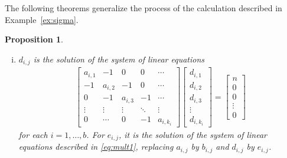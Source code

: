 \documentclass[10pt,a4paper,reqno]{amsart}
\newtheorem{prop}[thm]{Proposition}
\theoremstyle{definition}
\numberwithin{equation}{section}
\numberwithin{figure}{section}
\begin{document}
The following theorems generalize the process of the calculation described in Example~\ref{ex:sigma}.

\begin{prop}\label{prop:square1}
\begin{enumerate}[(i)]
\item $d_{i,j}$ is the solution of the system of linear equations
\begin{align}\label{eq:mult1}
\begin{bmatrix}
a_{i,1} & -1 & 0 & 0  & \cdots \\ 
-1 & a_{i,2} & -1 & 0 & \cdots \\ 
0 &-1 & a_{i,3} & -1 & \cdots \\ 
\vdots & \vdots &\vdots & \ddots  & \vdots \\ 
0 & \cdots & 0 & -1 & a_{i, k_{i}} \end{bmatrix}
\begin{bmatrix}
 d_{i,1} \\ d_{i,2} \\ d_{i,3} \\ \vdots \\ d_{i,k_i}
\end{bmatrix}
=\begin{bmatrix}
n \\ 0 \\ 0 \\ \vdots \\ 0
\end{bmatrix}
\end{align}
for each $i=1,\dots,b$. 
For $e_{i,j}$, it is the solution of the system of linear equations described in \eqref{eq:mult1}, replacing $a_{i,j}$ by $b_{i,j}$ and $d_{i,j}$ by $e_{i,j}$.


\end{enumerate}
\end{prop}
\end{document}
